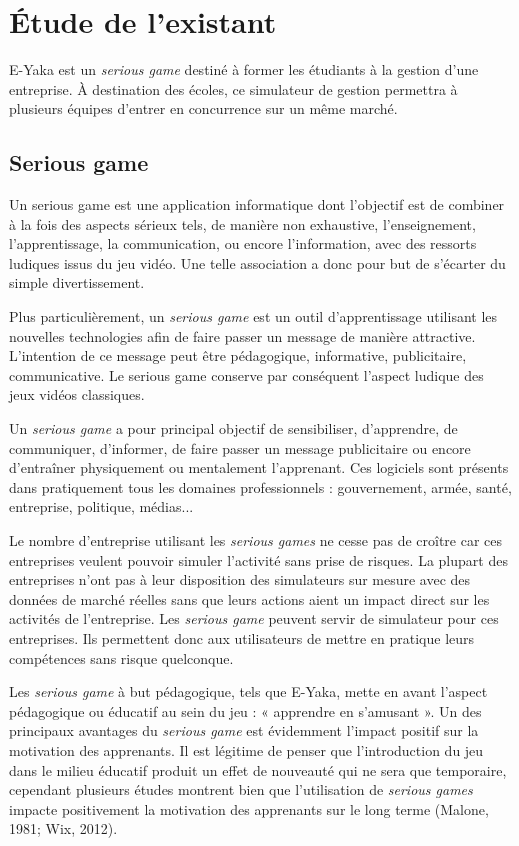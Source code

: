 \chapter{Étude de l’existant  }

E-Yaka est un \emph{serious game} destiné à former les étudiants à la gestion d'une entreprise. À destination des écoles, ce simulateur de gestion permettra à plusieurs équipes d'entrer en concurrence sur un même marché.

    \section{Serious game}

Un serious game est une application informatique dont l'objectif est de combiner à la fois des aspects sérieux tels, de manière non exhaustive, l'enseignement, l'apprentissage, la communication, ou encore l'information, avec des ressorts ludiques issus du jeu vidéo. Une telle association a donc pour but de s'écarter du simple divertissement.

Plus particulièrement, un \emph{serious game} est un outil d’apprentissage utilisant les nouvelles technologies afin de faire passer un message de manière attractive. L’intention de ce message peut être pédagogique, informative, publicitaire, communicative. Le serious game conserve par conséquent l’aspect ludique des jeux vidéos classiques.

Un \emph{serious game} a pour principal objectif de sensibiliser, d’apprendre, de communiquer, d’informer, de faire passer un message publicitaire ou encore d’entraîner physiquement ou mentalement l’apprenant. Ces logiciels sont présents dans pratiquement tous les domaines professionnels : gouvernement, armée, santé, entreprise, politique, médias...

Le nombre d’entreprise utilisant les \emph{serious games} ne cesse pas de croître car ces entreprises veulent pouvoir simuler l’activité sans prise de risques. La plupart des entreprises n’ont pas à leur disposition des simulateurs sur mesure avec des données de marché réelles sans que leurs actions aient un impact direct sur les activités de l’entreprise. Les \emph{serious game} peuvent servir de simulateur pour ces entreprises. Ils permettent donc aux utilisateurs de mettre en pratique leurs compétences sans risque quelconque.

Les \emph{serious game} à but pédagogique, tels que E-Yaka, mette en avant l’aspect pédagogique ou éducatif au sein du jeu : « apprendre en s’amusant ». Un des principaux avantages du \emph{serious game} est évidemment l’impact positif sur la motivation des apprenants. Il est légitime de penser que l’introduction du jeu dans le milieu éducatif produit un effet de nouveauté qui ne sera que temporaire, cependant plusieurs études montrent bien que l’utilisation de \emph{serious games} impacte positivement la motivation des apprenants sur le long terme (Malone, 1981; Wix, 2012).

